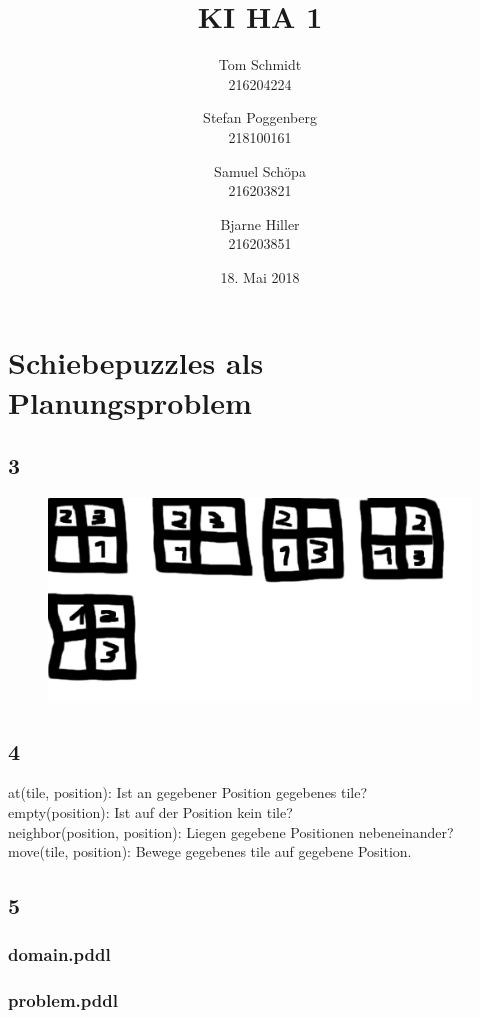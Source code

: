 \documentclass[fleqn]{scrartcl}
\author{Tom Schmidt\\216204224 \and Stefan Poggenberg\\218100161 \and Samuel Schöpa\\216203821 \and Bjarne Hiller\\216203851}
\title{KI HA 1}
\date{18. Mai 2018}
\begin{document}
\maketitle
\section{Schiebepuzzles als Planungsproblem}
\subsection{3}
\begin{figure}[h!]
  \includegraphics[width=\linewidth]{a2/3.PNG}
\end{figure}
\subsection{4}
  at(tile, position): Ist an gegebener Position gegebenes tile? \\
  empty(position): Ist auf der Position kein tile? \\
  neighbor(position, position): Liegen gegebene Positionen nebeneinander? \\
  move(tile, position): Bewege gegebenes tile auf gegebene Position. \\
\subsection{5}
\subsubsection{domain.pddl}

\subsubsection{problem.pddl}

\end{document}
